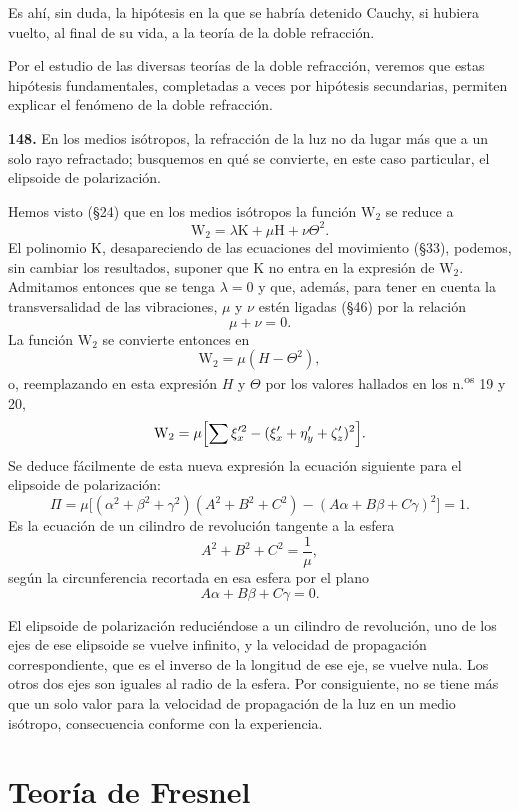 Es ahí, sin duda, la hipótesis en la que se habría detenido Cauchy, si
hubiera vuelto, al final de su vida, a la teoría de la doble refracción.

Por el estudio de las diversas teorías de la doble refracción, veremos que
estas hipótesis fundamentales, completadas a veces por hipótesis
secundarias, permiten explicar el fenómeno de la doble refracción.

\noindent\textbf{148.} En los medios isótropos, la refracción de la luz no
da lugar más que a un solo rayo refractado; busquemos en qué se convierte,
en este caso particular, el elipsoide de polarización.

Hemos visto (§24) que en los medios isótropos la función $\mathrm{W}_2$ se reduce a
\[
\mathrm{W}_2=\lambda\mathrm{K}+\mu\mathrm{H}+\nu\Theta^2.
\]
El polinomio $\mathrm{K}$, desapareciendo de las ecuaciones del movimiento (§33),
podemos, sin cambiar los resultados, suponer que $\mathrm{K}$ no entra en la
expresión de $\mathrm{W}_2$. Admitamos entonces que se tenga $\lambda=0$ y que,
además, para tener en cuenta la transversalidad de las vibraciones, $\mu$
y $\nu$ estén ligadas (§46) por la relación
\[
\mu+\nu=0.
\]
La función $\mathrm{W}_2$ se convierte entonces en
\[
\mathrm{W}_2=\mu(H-\Theta^2),
\]
o, reemplazando en esta expresión $H$ y $\Theta$ por los valores hallados
en los n.\textsuperscript{os} 19 y 20,
\[
\mathrm{W}_2=\mu\Bigl[\sum\xi'^2_x-(\xi'_x+\eta'_y+\zeta'_z)^2\Bigr].
\]
Se deduce fácilmente de esta nueva expresión la ecuación siguiente para el
elipsoide de polarización:
\[
\Pi=\mu\bigl[(\alpha^2+\beta^2+\gamma^2)(A^2+B^2+C^2)-(A\alpha+B\beta+C\gamma)^2\bigr]=1.
\]
Es la ecuación de un cilindro de revolución tangente a la esfera
\[
A^2+B^2+C^2=\frac{1}{\mu},
\]
según la circunferencia recortada en esa esfera por el plano
\[
A\alpha+B\beta+C\gamma=0.
\]

El elipsoide de polarización reduciéndose a un cilindro de revolución, uno
de los ejes de ese elipsoide se vuelve infinito, y la velocidad de
propagación correspondiente, que es el inverso de la longitud de ese eje,
se vuelve nula. Los otros dos ejes son iguales al radio de la esfera. Por
consiguiente, no se tiene más que un solo valor para la velocidad de
propagación de la luz en un medio isótropo, consecuencia conforme con la
experiencia.

\section{Teoría de Fresnel}

